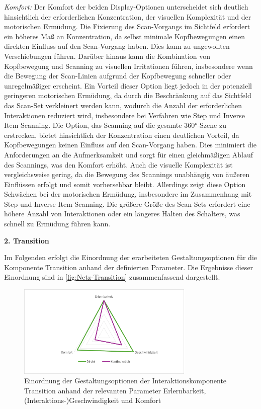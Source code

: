 \textit{Komfort:}
Der Komfort der beiden Display-Optionen unterscheidet sich deutlich hinsichtlich der erforderlichen Konzentration, der visuellen Komplexität und der motorischen Ermüdung.
Die Fixierung des Scan-Vorgangs im Sichtfeld erfordert ein höheres Maß an Konzentration, da selbst minimale Kopfbewegungen einen direkten Einfluss auf den Scan-Vorgang haben. Dies kann zu ungewollten Verschiebungen führen. Darüber hinaus kann die Kombination von Kopfbewegung und Scanning zu visuellen Irritationen führen, insbesondere wenn die Bewegung der Scan-Linien aufgrund der Kopfbewegung schneller oder unregelmäßiger erscheint. Ein Vorteil dieser Option liegt jedoch in der potenziell geringeren motorischen Ermüdung, da durch die Beschränkung auf das Sichtfeld das Scan-Set verkleinert werden kann, wodurch die Anzahl der erforderlichen Interaktionen reduziert wird, insbesondere bei Verfahren wie Step und Inverse Item Scanning. 
Die Option, das Scanning auf die gesamte 360°-Szene zu erstrecken, bietet hinsichtlich der Konzentration einen deutlichen Vorteil, da Kopfbewegungen keinen Einfluss auf den Scan-Vorgang haben. Dies minimiert die Anforderungen an die Aufmerksamkeit und sorgt für einen gleichmäßigen Ablauf des Scannings, was den Komfort erhöht. Auch die visuelle Komplexität ist vergleichsweise gering, da die Bewegung des Scannings unabhängig von äußeren Einflüssen erfolgt und somit vorhersehbar bleibt. Allerdings zeigt diese Option Schwächen bei der motorischen Ermüdung, insbesondere im Zusammenhang mit Step und Inverse Item Scanning. Die größere Größe des Scan-Sets erfordert eine höhere Anzahl von Interaktionen oder ein längeres Halten des Schalters, was schnell zu Ermüdung führen kann. 

\textbf{2. Transition} 

Im Folgenden erfolgt die Einordnung der erarbeiteten Gestaltungsoptionen für die Komponente Transition anhand der definierten Parameter. Die Ergebnisse dieser Einordnung sind in \autoref{fig:Netz-Transition} zusammenfassend dargestellt. 

\begin{figure}[tbh]
    \centering
    \includegraphics[width=0.75\textwidth]{images/Netzdiagramm-Transition.png}
    \caption{Einordnung der Gestaltungsoptionen der Interaktionskomponente Transition anhand der relevanten Parameter Erlernbarkeit, (Interaktions-)Geschwindigkeit und Komfort}
    \label{fig:Netz-Transition}
\end{figure}

